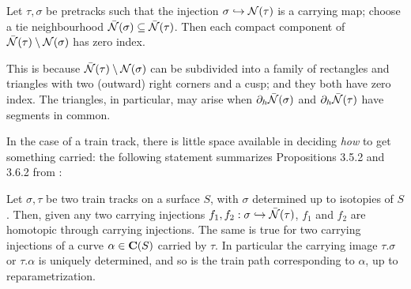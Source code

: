 \begin{rmk}\label{rmk:idx_of_nei_diff}
Let $\tau,\sigma$ be pretracks such that the injection $\sigma\hookrightarrow{\mathcal N}(\tau)$ is a carrying map; choose a tie neighbourhood $\bar{{\mathcal N}}(\sigma)\subseteq \bar{{\mathcal N}}(\tau)$. Then each compact component of $\bar{{\mathcal N}}(\tau)\setminus{\mathcal N}(\sigma)$ has zero index.

This is because $\bar{{\mathcal N}}(\tau)\setminus{\mathcal N}(\sigma)$ can be subdivided into a family of rectangles and triangles with two (outward) right corners and a cusp; and they both have zero index. The triangles, in particular, may arise when $\partial_h\bar{{\mathcal N}}(\sigma)$ and $\partial_h\bar{{\mathcal N}}(\tau)$ have segments in common.
\end{rmk}

In the case of a train track, there is little space available in deciding \emph{how} to get something carried: the following statement summarizes Propositions 3.5.2 and 3.6.2 from \cite{mosher}:
\begin{prop}\label{prp:carryingunique}
Let $\sigma,\tau$ be two train tracks on a surface $S$, with $\sigma$ determined up to isotopies of $S$. Then, given any two carrying injections $f_1,f_2:\sigma\hookrightarrow\bar{{\mathcal N}}(\tau)$, $f_1$ and $f_2$ are homotopic through carrying injections. The same is true for two carrying injections of a curve $\alpha\in\mathbf C(S)$ carried by $\tau$. In particular the carrying image $\tau.\sigma$ or $\tau.\alpha$ is uniquely determined, and so is the train path corresponding to $\alpha$, up to reparametrization.
\end{prop}

